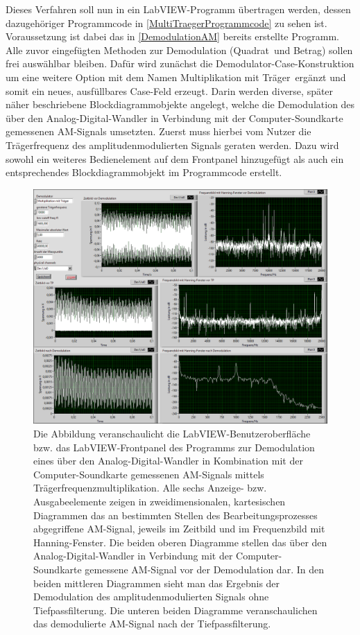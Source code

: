 \documentclass[
a4paper,
12pt,
pagesize,
ngerman
]{scrartcl}
\begin{document}
	Dieses Verfahren soll nun in ein LabVIEW-Programm übertragen werden, dessen dazugehöriger Programmcode in \ref{MultiTraegerProgrammcode} zu sehen ist. 
	Voraussetzung ist dabei das in \cref{DemodulationAM} bereits erstellte Programm.
	Alle zuvor eingefügten Methoden zur Demodulation (\glqq Quadrat\grqq\ und \glqq Betrag\grqq ) sollen frei auswählbar bleiben.
	Dafür wird zunächst die Demodulator-Case-Konstruktion um eine weitere Option mit dem Namen \glqq Multiplikation mit Träger\grqq\ ergänzt und somit ein neues, ausfüllbares Case-Feld erzeugt.
	Darin werden diverse, später näher beschriebene Blockdiagrammobjekte angelegt, welche die Demodulation des über den Analog-Digital-Wandler in Verbindung mit der Computer-Soundkarte gemessenen AM-Signals umsetzten.
	Zuerst muss hierbei vom Nutzer die Trägerfrequenz des amplitudenmodulierten Signals geraten werden.
	Dazu wird sowohl ein weiteres Bedienelement auf dem Frontpanel hinzugefügt als auch ein entsprechendes Blockdiagrammobjekt im Programmcode erstellt.
	
	\begin{figure}[H]
		\centering
		\includegraphics[width=1.0\textwidth]{EIRE2018Dateien/Tag4/traegerMultOszi/Oszilloskop__modifiziertp}
		\caption{Die Abbildung veranschaulicht die LabVIEW-Benutzeroberfläche bzw. das LabVIEW-Frontpanel des Programms zur Demodulation eines über den Analog-Digital-Wandler in Kombination mit der Computer-Soundkarte gemessenen AM-Signals mittels Trägerfrequenzmultiplikation. Alle sechs Anzeige- bzw. Ausgabeelemente zeigen in zweidimensionalen, kartesischen Diagrammen das an bestimmten Stellen des Bearbeitungsprozesses abgegriffene AM-Signal, jeweils im Zeitbild und im Frequenzbild mit Hanning-Fenster. Die beiden oberen Diagramme stellen das über den Analog-Digital-Wandler in Verbindung mit der Computer-Soundkarte gemessene AM-Signal vor der Demodulation dar. In den beiden mittleren Diagrammen sieht man das Ergebnis der Demodulation des amplitudenmodulierten Signals ohne Tiefpassfilterung. Die unteren beiden Diagramme veranschaulichen das demodulierte AM-Signal nach der Tiefpassfilterung.}
		\label{MultiTraegerFrontpanel}
	\end{figure}
\end{document}
